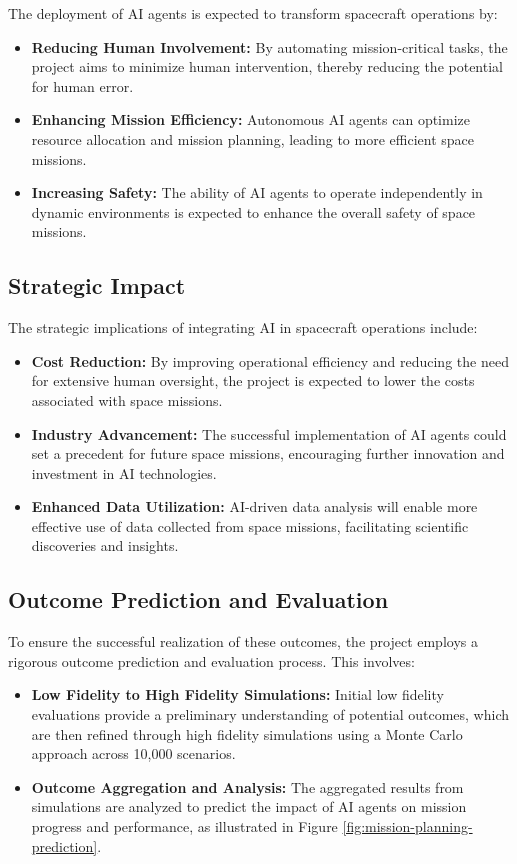\documentclass[a4paper, 11pt]{article}
\begin{document}
The deployment of AI agents is expected to transform spacecraft operations by:

\begin{itemize}
    \item \textbf{Reducing Human Involvement:} By automating mission-critical tasks, the project aims to minimize human intervention, thereby reducing the potential for human error.
    \item \textbf{Enhancing Mission Efficiency:} Autonomous AI agents can optimize resource allocation and mission planning, leading to more efficient space missions.
    \item \textbf{Increasing Safety:} The ability of AI agents to operate independently in dynamic environments is expected to enhance the overall safety of space missions.
\end{itemize}

\subsection{Strategic Impact}

The strategic implications of integrating AI in spacecraft operations include:

\begin{itemize}
    \item \textbf{Cost Reduction:} By improving operational efficiency and reducing the need for extensive human oversight, the project is expected to lower the costs associated with space missions.
    \item \textbf{Industry Advancement:} The successful implementation of AI agents could set a precedent for future space missions, encouraging further innovation and investment in AI technologies.
    \item \textbf{Enhanced Data Utilization:} AI-driven data analysis will enable more effective use of data collected from space missions, facilitating scientific discoveries and insights.
\end{itemize}

\subsection{Outcome Prediction and Evaluation}

To ensure the successful realization of these outcomes, the project employs a rigorous outcome prediction and evaluation process. This involves:

\begin{itemize}
    \item \textbf{Low Fidelity to High Fidelity Simulations:} Initial low fidelity evaluations provide a preliminary understanding of potential outcomes, which are then refined through high fidelity simulations using a Monte Carlo approach across 10,000 scenarios.
    \item \textbf{Outcome Aggregation and Analysis:} The aggregated results from simulations are analyzed to predict the impact of AI agents on mission progress and performance, as illustrated in Figure \ref{fig:mission-planning-prediction}.
\end{itemize}
\end{document}
